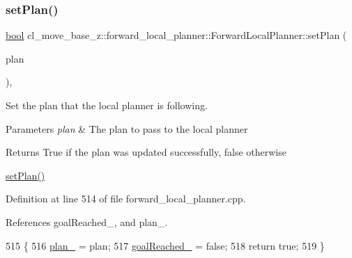 \mbox{\label{classcl__move__base__z_1_1forward__local__planner_1_1ForwardLocalPlanner_aac2e1031779520d47a4864acbc312939}} 
\subsubsection{\texorpdfstring{set\+Plan()}{setPlan()}}
{\footnotesize\ttfamily \hyperlink{classbool}{bool} cl\+\_\+move\+\_\+base\+\_\+z\+::forward\+\_\+local\+\_\+planner\+::\+Forward\+Local\+Planner\+::set\+Plan (\begin{DoxyParamCaption}\item[{const std\+::vector$<$ geometry\+\_\+msgs\+::\+Pose\+Stamped $>$ \&}]{plan }\end{DoxyParamCaption})\hspace{0.3cm}{\ttfamily [override]}, {\ttfamily [virtual]}}



Set the plan that the local planner is following. 


\begin{DoxyParams}{Parameters}
{\em plan} & The plan to pass to the local planner \\
\hline
\end{DoxyParams}
\begin{DoxyReturn}{Returns}
True if the plan was updated successfully, false otherwise
\end{DoxyReturn}
\hyperlink{classcl__move__base__z_1_1forward__local__planner_1_1ForwardLocalPlanner_aac2e1031779520d47a4864acbc312939}{set\+Plan()} 

Definition at line 514 of file forward\+\_\+local\+\_\+planner.\+cpp.



References goal\+Reached\+\_\+, and plan\+\_\+.


\begin{DoxyCode}
515 \{
516     \hyperlink{classcl__move__base__z_1_1forward__local__planner_1_1ForwardLocalPlanner_a929e5d0a9db3027810beb658a2343560}{plan\_} = plan;
517     \hyperlink{classcl__move__base__z_1_1forward__local__planner_1_1ForwardLocalPlanner_a9d51ad6f0eb364ebd830526280bdf4fc}{goalReached\_} = \textcolor{keyword}{false};
518     \textcolor{keywordflow}{return} \textcolor{keyword}{true};
519 \}
\end{DoxyCode}


